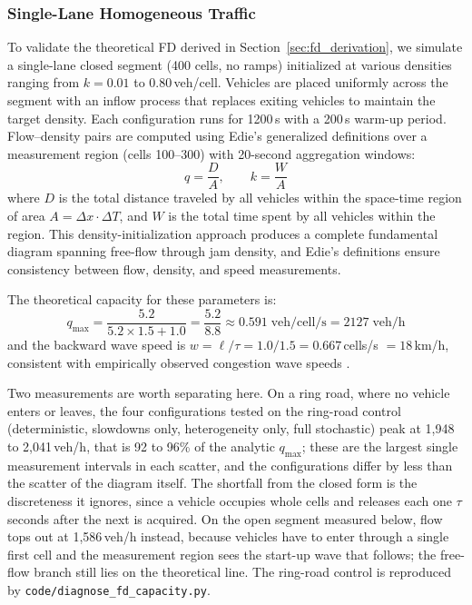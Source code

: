 \documentclass[review,authoryear]{elsarticle}
\begin{document}
\subsubsection{Single-Lane Homogeneous Traffic}

To validate the theoretical FD derived in Section~\ref{sec:fd_derivation}, we simulate a single-lane closed segment (400 cells, no ramps) initialized at various densities ranging from $k = 0.01$ to $0.80$\,veh/cell. Vehicles are placed uniformly across the segment with an inflow process that replaces exiting vehicles to maintain the target density. Each configuration runs for 1200\,s with a 200\,s warm-up period. Flow--density pairs are computed using Edie's generalized definitions \citep{edie1963discussion} over a measurement region (cells 100--300) with 20-second aggregation windows:
\begin{equation}
    q = \frac{D}{A}, \qquad k = \frac{W}{A}
    \label{eq:fd_measurement}
\end{equation}
where $D$ is the total distance traveled by all vehicles within the space-time region of area $A = \Delta x \cdot \Delta T$, and $W$ is the total time spent by all vehicles within the region. This density-initialization approach produces a complete fundamental diagram spanning free-flow through jam density, and Edie's definitions ensure consistency between flow, density, and speed measurements.

The theoretical capacity for these parameters is:
\begin{equation}
    q_{\max} = \frac{5.2}{5.2 \times 1.5 + 1.0} = \frac{5.2}{8.8} \approx 0.591\;\text{veh/cell/s} = 2127\;\text{veh/h}
\end{equation}
and the backward wave speed is $w = \ell/\tau = 1.0/1.5 = 0.667$\,cells/s $= 18$\,km/h, consistent with empirically observed congestion wave speeds \citep{cassidy1998bivariate}.

Two measurements are worth separating here. On a ring road, where no vehicle enters or leaves, the four configurations tested on the ring-road control (deterministic, slowdowns only, heterogeneity only, full stochastic) peak at 1{,}948 to 2{,}041\,veh/h, that is 92 to 96\% of the analytic $q_{\max}$; these are the largest single measurement intervals in each scatter, and the configurations differ by less than the scatter of the diagram itself. The shortfall from the closed form is the discreteness it ignores, since a vehicle occupies whole cells and releases each one $\tau$ seconds after the next is acquired. On the open segment measured below, flow tops out at 1{,}586\,veh/h instead, because vehicles have to enter through a single first cell and the measurement region sees the start-up wave that follows; the free-flow branch still lies on the theoretical line. The ring-road control is reproduced by \texttt{code/diagnose\_fd\_capacity.py}.
\end{document}
